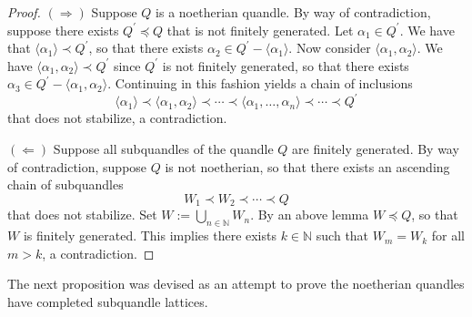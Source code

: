 \documentclass[reqno,dvipsnames]{amsart}
\newcommand{\p}{\prime}
\newcommand{\la}{\langle}
\newcommand{\ra}{\rangle}
\newcommand{\N}{\mathbb{N}}
\renewcommand{\a}{\alpha}
\theoremstyle{definition}
\begin{document}
\begin{proof}
$(\Rightarrow)$ Suppose $Q$ is a noetherian quandle. By way of contradiction, suppose there exists $Q^\p\preceq Q$ that is not finitely generated. Let $\alpha_1 \in Q^\p$. We have that $\la\a_1\ra\prec Q^\p$, so that there exists $\a_2\in Q^\p-\la\a_1\ra$. Now consider $\la\a_1,\a_2\ra$. We have $\la\a_1,\a_2\ra\prec Q^\p$ since $Q^\p$ is not finitely generated, so that there exists $\a_3\in Q^\p-\la\a_1,\a_2\ra$. Continuing in this fashion yields a chain of inclusions
\[\la\a_1\ra\prec\la\a_1,\a_2\ra\prec\cdots\prec\la\a_1,\dots,\a_n\ra\prec\cdots\prec Q^\p\]
that does not stabilize, a contradiction.

$(\Leftarrow)$ Suppose all subquandles of the quandle $Q$ are finitely generated. By way of contradiction, suppose $Q$ is not noetherian, so that there exists an ascending chain of subquandles
\[W_1\prec W_2\prec\cdots\prec Q\]
that does not stabilize. Set $W:=\bigcup_{n\in\N}W_n$. By an above lemma $W\preceq Q$, so that $W$ is finitely generated. This implies there exists $k\in\N$ such that $W_m= W_k$ for all $m>k$, a contradiction.
\end{proof}

The next proposition was devised as an attempt to prove the noetherian quandles have completed subquandle lattices.
\end{document}
